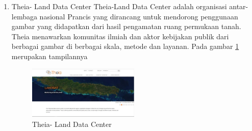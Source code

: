 \begin{enumerate}
\item Theia- Land Data Center
Theia-Land Data Center adalah organisasi antar-lembaga nasional Prancis yang dirancang untuk mendorong penggunaan gambar yang didapatkan dari hasil pengamatan ruang permukaan tanah. Theia menawarkan komunitas ilmiah dan aktor kebijakan publik dari berbagai gambar di berbagai skala, metode dan layanan.  Pada gambar \ref{labelgambar7} merupakan tampilannya  
\begin{figure}[ht]
\centering
\includegraphics[width=0.5\textwidth]{pictures/Theia_Land_Data_Center}
\caption{Theia- Land Data Center}
\label{labelgambar7}
\end{figure}
\end{enumerate}